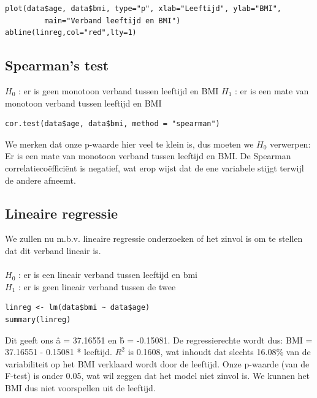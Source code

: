 \documentclass{article}
\begin{document}
\begin{verbatim}
plot(data$age, data$bmi, type="p", xlab="Leeftijd", ylab="BMI", 
	     main="Verband leeftijd en BMI")
abline(linreg,col="red",lty=1)
\end{verbatim}

\subsection{Spearman's test}
$H_0$ : er is geen monotoon verband tussen leeftijd en BMI
$H_1$ : er is een mate van monotoon verband tussen leeftijd en BMI

\begin{verbatim}
cor.test(data$age, data$bmi, method = "spearman") 
\end{verbatim}

We merken dat onze p-waarde hier veel te klein is, dus moeten we $H_0$ verwerpen: Er is een mate van monotoon verband tussen leeftijd en BMI. De Spearman correlatieco\"effici\"ent is negatief, wat erop wijst dat de ene variabele stijgt terwijl de andere afneemt.

\subsection{Lineaire regressie}

We zullen nu m.b.v. lineaire regressie onderzoeken of het zinvol is om te stellen dat dit verband lineair is. \\ \\

$H_0$ : er is een lineair verband tussen leeftijd en bmi\\
$H_1$ : er is geen lineair verband tussen de twee

\begin{verbatim}
linreg <- lm(data$bmi ~ data$age)
summary(linreg)
\end{verbatim}

Dit geeft ons \^a = 37.16551 en \^b = -0.15081. De regressierechte wordt dus: BMI = 37.16551 - 0.15081 * leeftijd. $R^2$ is 0.1608, wat inhoudt dat slechts 16.08\% van de variabiliteit op het BMI verklaard wordt door de leeftijd. Onze p-waarde (van de F-test) is onder 0.05, wat wil zeggen dat het model niet zinvol is. We kunnen het BMI dus niet voorspellen uit de leeftijd.

%
%
%
\end{document}
